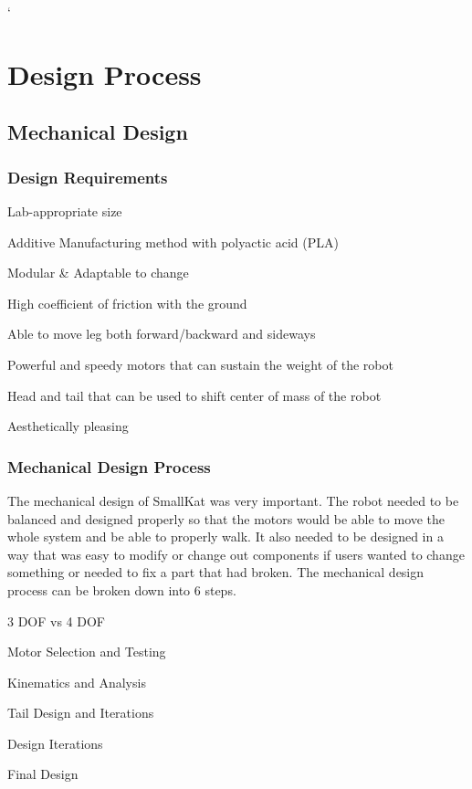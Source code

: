 `\section{Design Process} %


    \subsection{Mechanical Design} 

        \subsubsection{Design Requirements}
            \begin{Deliverables}
                \item Lab-appropriate size
                \item Additive Manufacturing method with polyactic acid (PLA)
                \item Modular \& Adaptable to change
                \item High coefficient of friction with the ground
                \item Able to move leg both forward/backward and sideways
                \item Powerful and speedy motors that can sustain the weight of the robot
                \item Head and tail that can be used to shift center of mass of the robot
                \item Aesthetically pleasing
            \end{Deliverables}
            
         \subsubsection{Mechanical Design Process}
            The mechanical design of SmallKat was very important. The robot needed to be balanced and designed properly so that the motors would be able to move the whole system and be able to properly walk. It also needed to be designed in a way that was easy to modify or change out components if users wanted to change something or needed to fix a part that had broken. The mechanical design process can be broken down into 6 steps. 
             \begin{Deliverables}
                \item 3 DOF vs 4 DOF
                \item Motor Selection and Testing
                \item Kinematics and Analysis
                \item Tail Design and Iterations
                \item Design Iterations
                \item Final Design
            \end{Deliverables}

